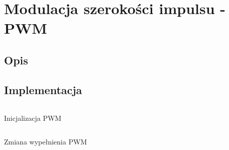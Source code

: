     \section{Modulacja szerokości impulsu - PWM} 
        \subsection{Opis}
        
        \subsection{Implementacja}
        
        
        \begin{kod}
          \inputminted[firstline=3,lastline=24]{cpp}{esp/listings/motor_driver.cpp}
          \caption{Inicjalizacja PWM}
          \label{code:pwm_init}
          \vspace{2em}
        \end{kod}
        
        \begin{kod}
          \inputminted[firstline=27]{cpp}{esp/listings/motor_driver.cpp}
          \caption{Zmiana wypełnienia PWM}
          \label{code:pwm_duty}
          \vspace{2em}
        \end{kod}